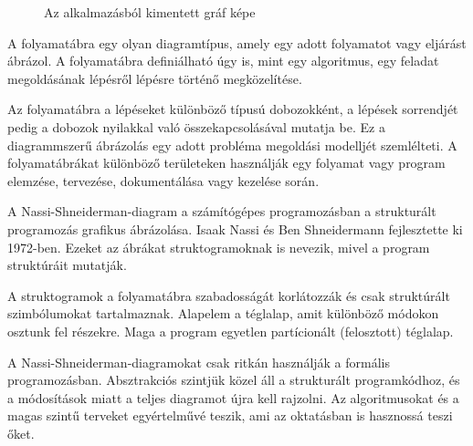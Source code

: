 \begin{figure}[!h]
	\label{fig:graph_tikz}
	\centering
	
	\caption{Az alkalmazásból kimentett gráf képe}
\end{figure}


A folyamatábra egy olyan diagramtípus, amely egy adott folyamatot vagy eljárást ábrázol. A folyamatábra definiálható úgy is, mint egy algoritmus, egy feladat megoldásának lépésről lépésre történő megközelítése.

Az folyamatábra a lépéseket különböző típusú dobozokként, a lépések sorrendjét pedig a dobozok nyilakkal való összekapcsolásával mutatja be. Ez a diagrammszerű ábrázolás egy adott probléma megoldási modelljét szemlélteti. A folyamatábrákat különböző területeken használják egy folyamat vagy program elemzése, tervezése, dokumentálása vagy kezelése során.



A Nassi-Shneiderman-diagram a számítógépes programozásban a strukturált programozás grafikus ábrázolása. Isaak Nassi és Ben Shneidermann fejlesztette ki 1972-ben. Ezeket az ábrákat struktogramoknak is nevezik, mivel a program struktúráit mutatják.

A struktogramok a folyamatábra szabadosságát korlátozzák és csak struktúrált szimbólumokat tartalmaznak. Alapelem a téglalap, amit különböző módokon osztunk fel részekre. Maga a program egyetlen partícionált (felosztott) téglalap.

A Nassi-Shneiderman-diagramokat csak ritkán használják a formális programozásban. Absztrakciós szintjük közel áll a strukturált programkódhoz, és a módosítások miatt a teljes diagramot újra kell rajzolni. Az algoritmusokat és a magas szintű terveket egyértelművé teszik, ami az oktatásban is hasznossá teszi őket.

